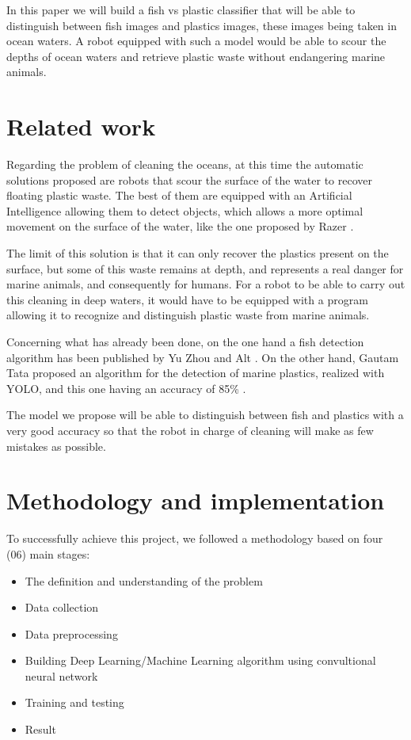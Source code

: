 \documentclass[a4paper, 12pt]{report}
\begin{document}
In this paper we will build a fish vs plastic classifier that will be able to distinguish between fish images and plastics images, these images being taken in ocean waters. A robot equipped with such a model would be able to scour the depths of ocean waters and retrieve plastic waste without endangering marine animals. 

\section{Related work}

Regarding the problem of cleaning the oceans, at this time the automatic solutions proposed are robots that scour the surface of the water to recover floating plastic waste. The best of them are equipped with an Artificial Intelligence allowing them to detect objects, which allows a more optimal movement on the surface of the water, like the one proposed by Razer \cite{razer_bot}. 

The limit of this solution is that it can only recover the plastics present on the surface, but some of this waste remains at depth, and represents a real danger for marine animals, and consequently for humans. For a robot to be able to carry out this cleaning in deep waters, it would have to be equipped with a program allowing it to recognize and distinguish plastic waste from marine animals. 

Concerning what has already been done, on the one hand a fish detection algorithm has been published by Yu Zhou and Alt \cite{fish_detection}. On the other hand, Gautam Tata proposed an algorithm for the detection of marine plastics, realized with YOLO, and this one having an accuracy of 85\% \cite{plastic_detection}. 

The model we propose will be able to distinguish between fish and plastics with a very good accuracy so that the robot in charge of cleaning will make as few mistakes as possible.

\section{Methodology and implementation}

To successfully achieve this project, we followed a methodology based on four (06) main stages:

\begin{itemize}

    \item The definition and understanding of the problem

    \item Data collection
    
    \item Data preprocessing

    \item Building Deep Learning/Machine Learning algorithm using convultional neural network

    \item Training and testing

    \item Result
    
\end{itemize}
\end{document}
